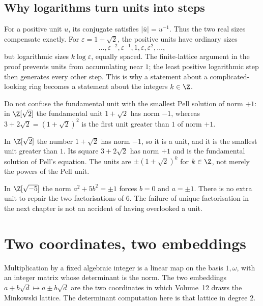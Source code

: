 \subsection*{Why logarithms turn units into steps}
For a positive unit $u$, its conjugate satisfies $|\bar u|=u^{-1}$.
Thus the two real sizes compensate exactly. For $\varepsilon=1+\sqrt2$,
the positive units have ordinary sizes
\[
\ldots,\varepsilon^{-2},\varepsilon^{-1},1,\varepsilon,
\varepsilon^2,\ldots,
\]
but logarithmic sizes $k\log\varepsilon$, equally spaced.
The finite-lattice argument in the proof prevents units from accumulating near
$1$; the least positive logarithmic step then generates every other step.
This is why a statement about a complicated-looking ring becomes a statement
about the integers $k\in\Z$.

Do not confuse the fundamental unit with the smallest Pell solution of norm
$+1$: in $\Z[\sqrt2]$ the fundamental unit $1+\sqrt2$ has norm $-1$, whereas
$3+2\sqrt2=(1+\sqrt2)^2$ is the first unit greater than $1$ of norm $+1$.

\begin{examplex}
In $\Z[\sqrt 2]$ the number $1+\sqrt 2$ has norm $-1$, so it is a unit, and it is the smallest unit greater than $1$. Its square $3+2\sqrt 2$ has norm $+1$ and is the fundamental solution of Pell's equation. The units are $\pm(1+\sqrt 2)^k$ for $k\in\Z$, not merely the powers of the Pell unit.
\end{examplex}

\begin{examplex}
In $\Z[\sqrt{-5}]$ the norm $a^2+5b^2=\pm 1$ forces $b=0$ and $a=\pm 1$. There is no extra unit to repair the two factorisations of $6$. The failure of unique factorisation in the next chapter is not an accident of having overlooked a unit.
\end{examplex}

\section{Two coordinates, two embeddings}

Multiplication by a fixed algebraic integer is a linear map on the basis $1,\omega$, with an integer matrix whose determinant is the norm. The two embeddings $a+b\sqrt d\mapsto a\pm b\sqrt d$ are the two coordinates in which Volume~12 draws the Minkowski lattice. The determinant computation here is that lattice in degree $2$.

